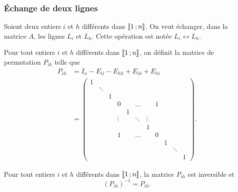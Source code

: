 \subsubsection{Échange de deux lignes}
Soient deux entiers \(i\) et \(h\) différents dans \(\mathopen{\llbracket}1\mathclose{}\mathpunct{};n\mathclose{\rrbracket}\). 
On veut échanger, dans la matrice \(A\), les lignes \(L_i\) et \(L_h\). Cette 
opération est notée \(L_i \leftrightarrow L_h\).
\begin{defdef}
  Pour tout entiers \(i\) et \(h\) différents dans \(\mathopen{\llbracket}1\mathclose{}\mathpunct{};n\mathclose{\rrbracket}\), 
  on définit la matrice de permutation \(P_{ih}\) telle que
  \begin{align*}
    P_{ih} &= I_n - E_{ii}-E_{hh} +E_{ih}+E_{hi}\\
           & = \begin{pmatrix}
             1&        &  &        &   &        &        &   &   &        & \\
              & \ddots &  &        &   &        &        &   &   &        & \\
              &        &1 &        &   &        &        &   &   &        & \\
              &        &  & 0      &   & \ldots &        & 1 &   &        & \\
              &        &  &        & 1 &        &        &   &   &        & \\
              &        &  & \vdots &   & \ddots & \vdots &   &   &        & \\
              &        &  &        &   &        & 1      &   &   &        & \\
              &        &  & 1      &   & \ldots &        & 0 &   &        & \\
              &        &  &        &   &        &        &   & 1 &        & \\
              &        &  &        &   &        &        &   &   & \ddots & \\
              &        &  &        &   &        &        &   &   &        & 1
           \end{pmatrix}.
  \end{align*}
\end{defdef}
%
\begin{prop}
  Pour tout entiers \(i\) et \(h\) différents dans \(\mathopen{\llbracket}1\mathclose{}\mathpunct{};n\mathclose{\rrbracket}\), 
  la matrice \(P_{ih}\) est inversible et
  \begin{equation}
    (P_{ih})^{-1} = P_{ih}.
  \end{equation}
\end{prop}
